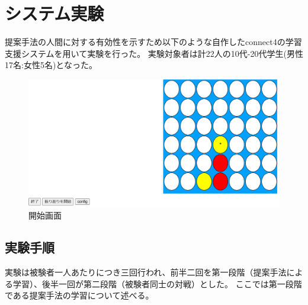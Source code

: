 \section{システム実験}
提案手法の人間に対する有効性を示すため以下のような自作したconnect4の学習支援システムを用いて実験を行った。
実験対象者は計22人の10代-20代学生(男性17名:女性5名)となった。
\begin{figure}[t]
	\centering
	\includegraphics[width=\linewidth]{./figure/basicSystem.png}
	\caption{開始画面}
	\label{fig:basic}
\end{figure}
\subsection{実験手順}
実験は被験者一人あたりにつき三回行われ、前半二回を第一段階（提案手法による学習）、後半一回が第二段階（被験者同士の対戦）とした。
ここでは第一段階である提案手法の学習について述べる。
